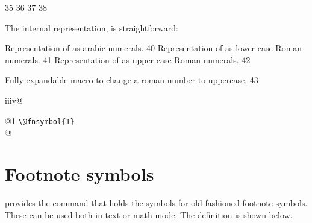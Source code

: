 \begin{teXXX}
35 \def\roman#1{\expandafter\@roman\csname c@#1\endcsname}
36 \def\Roman#1{\expandafter\@Roman\csname c@#1\endcsname}
37 \def\alph#1{\expandafter\@alph\csname c@#1\endcsname}
38 \def\Alph#1{\expandafter\@Alph\csname c@#1\endcsname}
\end{teXXX}

The internal representation, is straightforward:

\begin{teXXX}
\@arabic \@arabic\FOOcounter Representation of \FOOcounter as arabic numerals.
40 \def\@arabic#1{\number #1} %
\@roman \@roman\FOOcounter Representation of \FOOcounter as lower-case Roman numerals.
41 \def\@roman#1{\romannumeral #1}
\@Roman \@Roman\FOOcounter Representation of \FOOcounter as upper-case Roman numerals.
42 \def\@Roman#1{\expandafter\@slowromancap\romannumeral #1@}
\end{teXXX}



\begin{teXXX}
\@slowromancap Fully expandable macro to change a roman number to uppercase.
43 \def\@slowromancap#1{\ifx @#1%
44 \else
45 \if i#1I\else\if v#1V\else\if x#1X\else\if l#1L\else\if
46 c#1C\else\if d#1D\else \if m#1M\else#1\fi\fi\fi\fi\fi\fi\fi
47 \expandafter\@slowromancap
48 \fi
49 }
\end{teXXX}



\makeatletter
\begin{teX}
\@slowromancap iiiv@ 
\end{teX}



\def\@Slowroman#1{\ifx @#1%
 \else
   \@fnsymbol#1 \texttt{\textbackslash @fnsymbol\{#1\}\\ } \expandafter\@Slowroman
 \fi
 }


\noindent \@Slowroman 123456789 @




\section{Footnote symbols}

\LaTeXe provides the  command that holds the symbols for old fashioned footnote symbols. These can be used both in text or math mode. The definition is shown below.

\bigskip


